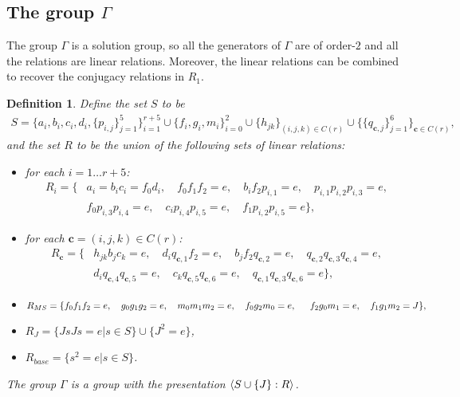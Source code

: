 \documentclass[11pt,letterpaper]{article}
\DeclarePairedDelimiter{\ip}{\langle}{\rangle}
\newcommand{\1}{\mathbb{1}}
\newcommand{\bc}{\pmb{c}}
\newtheorem{definition}[theorem]{Definition}
\theoremstyle{definition}
\begin{document}
\subsection{The group $\Gamma$}
\label{sec:gamma}
The group $\Gamma$ is a solution group,
so all the generators of $\Gamma$ are of order-$2$
and all the relations are linear relations.
Moreover, the linear relations can be combined
to recover the conjugacy relations in $R_1$.
\begin{definition}
\label{def:gamma}
Define the set $S$ to be 
\begin{align*}
	S = \{a_i, b_i, c_i, d_i,\{ p_{i,j} \}_{j=1}^5\}_{i=1}^{r+5} \cup \{f_i,g_i,m_i\}_{i=0}^2 \cup \{h_{jk}\}_{(i,j,k) \in C(r)} \cup 
	\{\{q_{\bc,j} \}_{j=1}^6\}_{\bc \in C(r)},
\end{align*}
and the set $R$ to be the union of the following
sets of linear relations:
\begin{itemize}
\item for each $i = 1 \dots r+5$:
\begin{align*}
	R_i =  \{ &a_i = b_ic_i = f_0d_i,\quad
	f_0 f_1 f_2 = e, \quad b_i f_2 p_{i,1} = e, \quad p_{i,1} p_{i,2} p_{i,3} = e,\\
	&f_0 p_{i,3} p_{i,4} = e, \quad c_i p_{i,4} p_{i,5} =e, \quad f_1 p_{i,2} p_{i,5} = e\},
\end{align*}
\item for each $ \bc = (i,j,k) \in C(r)$:
\begin{align*}
	R_{\bc} = \{&h_{jk}b_j c_k = e, \quad
	d_i q_{\bc,1} f_2 = e, \quad b_j f_2 q_{\bc,2} = e, \quad q_{\bc,2} q_{\bc,3} q_{\bc,4} = e,\\
	&d_i q_{\bc,4} q_{\bc,5} = e, \quad c_k q_{\bc,5} q_{\bc,6} =e, \quad q_{\bc,1} q_{\bc,3} q_{\bc,6} = e\},
\end{align*}
\item 
$
	R_{MS} = \{f_0 f_1 f_2 = e,\quad g_0 g_1 g_2 = e, \quad m_0 m_1 m_2 = e, \quad
	f_0 g_2 m_0 = e, \\ \indent f_2 g_0 m_1 = e, \quad f_1 g_1 m_2 = J\},
$
\item $R_J = \{ J s J s = e \vert s \in S\} \cup \{J^2 = e\}$,
\item $R_{base} = \{ s^2 = e \vert s \in S\}$.
\end{itemize}
The group $\Gamma$ is a group with the presentation
$\ip{S \cup \{J\} : R}$.
\end{definition}
\end{document}
